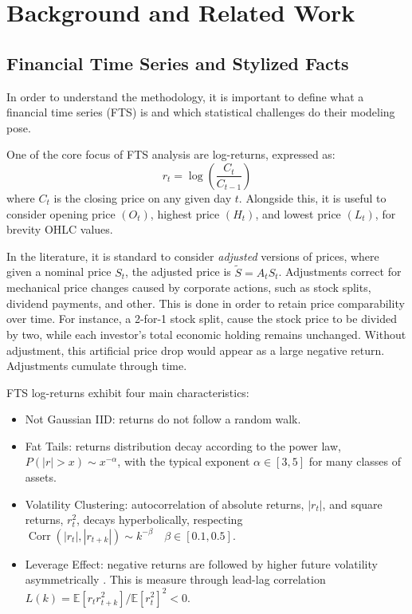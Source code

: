\chapter{Background and Related Work}
\label{ch:literature_review}
\section{Financial Time Series and Stylized Facts}
\label{sec:fts_literature}
In order to understand the methodology, it is important to define what a financial time series (FTS) is and which statistical challenges do their modeling pose.

One of the core focus of FTS analysis are log-returns, expressed as:
\begin{equation}
    \label{eq:log_returns}
    r_t=\log\left(\frac{C_t}{C_{t-1}}\right)
\end{equation}
where $C_t$ is the closing price on any given day $t$. Alongside this, it is useful to consider opening price $\left(O_t\right)$, highest price $\left(H_t\right)$, and lowest price $\left(L_t\right)$, for brevity OHLC values. 

In the literature, it is standard to consider \textit{adjusted} versions of prices, where given a nominal price $S_t$, the adjusted price is $\widetilde{S}=A_tS_t$.
Adjustments correct for mechanical price changes caused by corporate actions, such as stock splits, dividend payments, and other. This is done in order to retain price comparability over time. For instance, a 2-for-1 stock split, cause the stock price to be divided by two, while each investor's total economic holding remains unchanged. Without adjustment, this artificial price drop would appear as a large negative return. Adjustments cumulate through time. 

FTS log-returns exhibit four main characteristics:
\begin{itemize}
    \item Not Gaussian IID: returns do not follow a random walk.
    \item Fat Tails: returns distribution decay according to the power law, $P(|r|>x)\sim x^{-\alpha}$, with the typical exponent $\alpha\in[3,5]$ for many classes of assets.
    \item Volatility Clustering: autocorrelation of absolute returns, $|r_t|$, and square returns, \(r^2_t\), decays hyperbolically, respecting \(\operatorname{Corr}(|r_t|, |r_{t+k}|)\sim k^{-\beta} \quad \beta\in [0.1,0.5]\).
    \item Leverage Effect: negative returns are followed by higher future volatility asymmetrically \cite{black1976studies}. This is measure through lead-lag correlation \(L(k)=\mathbb{E}\left[r_tr_{t+k}^2 \right]/\mathbb{E}\left[r_t^2\right]^2<0\).
\end{itemize}

